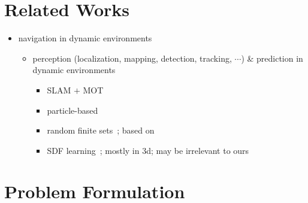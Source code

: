 \documentclass[lettersize,journal]{IEEEtran}
\begin{document}
\section{Related Works}
\begin{itemize}
    \item navigation in dynamic environments
    \begin{itemize}
        \item perception (localization, mapping, detection, tracking, $\cdots$) \& prediction in dynamic environments
        \begin{itemize}
            \item SLAM $+$ MOT~\cite{wang2007simultaneous,coue2006bayesian}

            \item particle-based~\cite{danescu2011modeling,tanzmeister2014grid}
            
            \item random finite sets~\cite{nuss2018random,chen2023continuous}; based on~\cite{mahler2007statistical}

            \item SDF learning~\cite{park2019deepsdf,ortiz2022isdf}; mostly in 3d; may be irrelevant to ours
        \end{itemize}
    \end{itemize}

    
\end{itemize}




\section{Problem Formulation}
\end{document}
